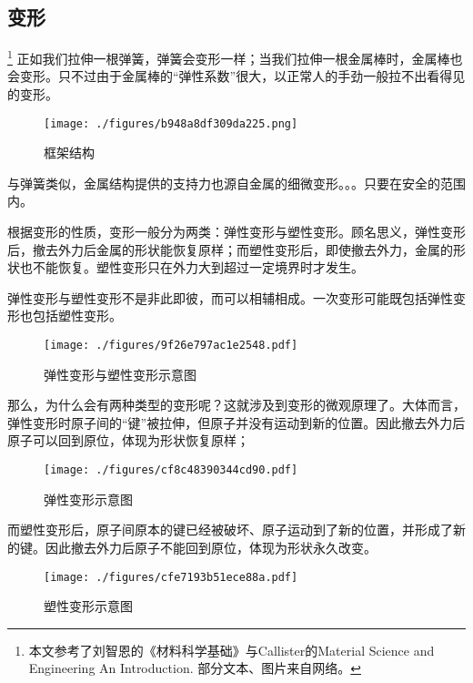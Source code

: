 
\subsection{变形}
\footnote{本文参考了刘智恩的《材料科学基础》与Callister的Material Science and Engineering An Introduction. 部分文本、图片来自网络。}
正如我们拉伸一根弹簧，弹簧会变形一样；当我们拉伸一根金属棒时，金属棒也会变形。只不过由于金属棒的“弹性系数”很大，以正常人的手劲一般拉不出看得见的变形。

\begin{example}{}
\begin{figure}[ht]
\centering
\texttt{[image: ./figures/b948a8df309da225.png]}
\caption{框架结构} \label{fig_MetDfm_1}
\end{figure}
与弹簧类似，金属结构提供的支持力也源自金属的细微变形。。。只要在安全的范围内。
\end{example}

根据变形的性质，变形一般分为两类：弹性变形与塑性变形。顾名思义，弹性变形后，撤去外力后金属的形状能恢复原样；而塑性变形后，即使撤去外力，金属的形状也不能恢复。塑性变形只在外力大到超过一定境界时才发生。

弹性变形与塑性变形不是非此即彼，而可以相辅相成。一次变形可能既包括弹性变形也包括塑性变形。

\begin{figure}[ht]
\centering
\texttt{[image: ./figures/9f26e797ac1e2548.pdf]}
\caption{弹性变形与塑性变形示意图} \label{fig_MetDfm_2}
\end{figure}

那么，为什么会有两种类型的变形呢？这就涉及到变形的微观原理了。大体而言，弹性变形时原子间的“键”被拉伸，但原子并没有运动到新的位置。因此撤去外力后原子可以回到原位，体现为形状恢复原样；
\begin{figure}[ht]
\centering
\texttt{[image: ./figures/cf8c48390344cd90.pdf]}
\caption{弹性变形示意图} \label{fig_MetDfm_11}
\end{figure}
而塑性变形后，原子间原本的键已经被破坏、原子运动到了新的位置，并形成了新的键。因此撤去外力后原子不能回到原位，体现为形状永久改变。
\begin{figure}[ht]
\centering
\texttt{[image: ./figures/cfe7193b51ece88a.pdf]}
\caption{塑性变形示意图} \label{fig_MetDfm_12}
\end{figure}

